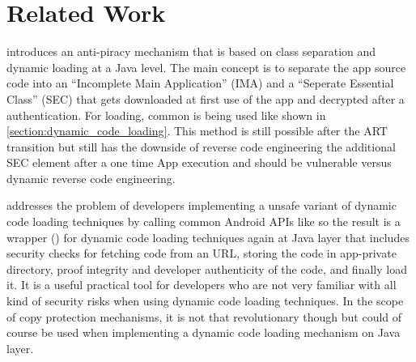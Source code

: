 \chapter{Related Work}\label{chapter:related_workd}
\parencite{anti_piracy} introduces an anti-piracy mechanism that is based on class
separation and dynamic loading at a Java level. The main concept is to separate the app source code into an ``Incomplete Main Application'' (IMA) and a ``Seperate Essential Class'' (SEC) that gets downloaded at first use of the app and decrypted after a authentication. For loading, common  is being used like shown in
\autoref{section:dynamic_code_loading}. This method is still possible after the ART transition but still has the downside of reverse code engineering the additional SEC 
element after a one time App execution and should be vulnerable versus dynamic reverse code engineering.

\parencite{grab_n_run} addresses the problem of developers implementing a unsafe variant of dynamic code loading techniques by calling common Android APIs like  so the result is a wrapper () for dynamic code loading techniques again at Java layer that includes security checks for fetching code from an URL, storing the code in app-private directory, proof integrity and developer authenticity of the code, and finally load it. It is a useful practical tool for developers who are not very familiar with all kind of security risks when using dynamic code loading techniques. In the scope of copy protection mechanisms, it is not that revolutionary though but could of course be used when implementing a dynamic code loading mechanism on Java layer.




